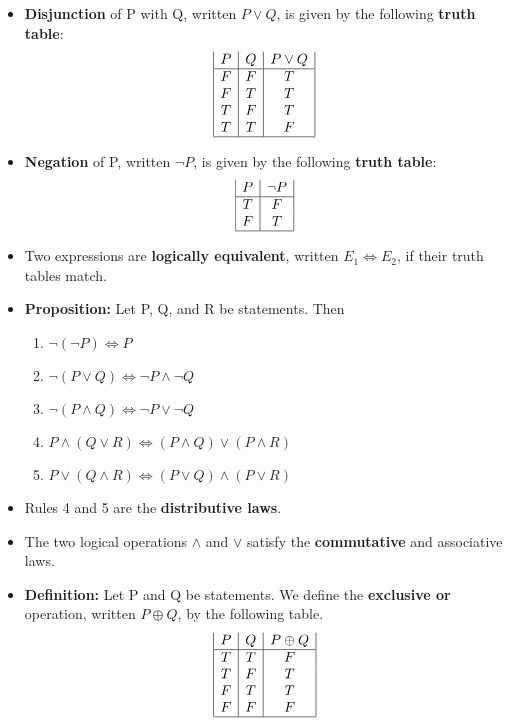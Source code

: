 \documentclass{report}
\begin{document}
\begin{itemize}
			\item \textbf{Disjunction} of P with Q, written $P\vee Q$, is given by the following \textbf{truth table}:
				\begin{displaymath}
				\begin{array}{|c|c|c|c|c|c|c}
				   P
				 & Q
				 & P\vee Q\\
				\hline
				F & F & T\\
				F & T & T\\
				T & F & T\\
				T & T & F\\
				\hline
				\end{array}
				\end{displaymath}
			\item \textbf{Negation} of P, written $\neg P$, is given by the following \textbf{truth table}:
				\begin{displaymath}
				\begin{array}{|c|c|c|c|c|c|c}
				   P
				 & \neg P\\
				\hline
				T & F\\
				F & T\\
				\hline
				\end{array}
				\end{displaymath}
			\item Two expressions are \textbf{logically equivalent}, written $E_1\Leftrightarrow E_2$, if their truth tables match.
			\item \textbf{Proposition:} Let P, Q, and R be statements. Then
			\begin{enumerate}\addtolength{\leftskip}{4em}
				\item $\neg (\neg P) \Longleftrightarrow P$
				\item $\neg (P\vee Q) \Longleftrightarrow \neg P \wedge \neg Q$
				\item $\neg (P\wedge Q) \Longleftrightarrow \neg P \vee \neg Q$
				\item $P\wedge (Q \vee R) \Longleftrightarrow (P\wedge Q)\vee (P\wedge R)$
				\item $P\vee (Q \wedge R) \Longleftrightarrow (P\vee Q)\wedge (P\vee R)$
			\end{enumerate}
			\item Rules 4 and 5 are the \textbf{distributive laws}.
			\item The two logical operations $\wedge$ and $\vee$ satisfy the \textbf{commutative} and associative laws.
			\item \textbf{Definition:} Let P and Q be statements. We define the \textbf{exclusive or} operation, written $P\oplus Q$, by the following table.
				\begin{displaymath}
				\begin{array}{|c|c|c|c|c|c|c}
				   P
				 & Q
				 & P\oplus Q\\
				\hline
				T & T & F\\
				T & F & T\\
				F & T & T\\
				F & F & F\\
				\hline
				\end{array}
				\end{displaymath}
		\end{itemize}
\end{document}
